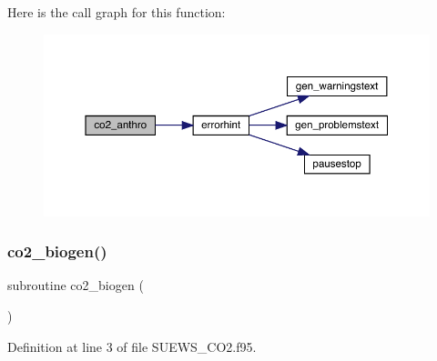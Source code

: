 Here is the call graph for this function\+:\nopagebreak
\begin{figure}[H]
\begin{center}
\leavevmode
\includegraphics[width=350pt]{_s_u_e_w_s___c_o2_8f95_a3d08af1e9ac16a2e04534ba1a9018988_cgraph}
\end{center}
\end{figure}
\mbox{\label{_s_u_e_w_s___c_o2_8f95_a32784914a86ccd9e508a6f20eff62b59}} 
\subsubsection{\texorpdfstring{co2\+\_\+biogen()}{co2\_biogen()}}
{\footnotesize\ttfamily subroutine co2\+\_\+biogen (\begin{DoxyParamCaption}{ }\end{DoxyParamCaption})}



Definition at line 3 of file S\+U\+E\+W\+S\+\_\+\+C\+O2.\+f95.

